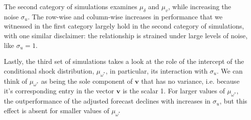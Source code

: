 \documentclass[11pt,3p,review,authoryear]{elsarticle}
\newcommand{\x}{\textbf{v}}
\theoremstyle{definition}
\begin{document}
The second category of simulations examines $\mu_{\delta}$ and $\mu_{v}$, while increasing the noise $\sigma_{u}$.  The row-wise and column-wise increases in performance that we witnessed in the first category largely hold in the second category of simulations, with one similar disclaimer: the relationship is strained under large levels of noise, like $\sigma_{u} = 1$.


Lastly, the third set of simulations takes a look at the role of the intercept of the conditional shock distribution, $\mu_{\omega^{*}}$, in particular, its interaction with $\sigma_{u}$.  We can think of $\mu_{\omega^{*}}$ as being the sole component of $\x$ that has no variance, i.e. because it's corresponding entry in the vector $\x$ is the scalar 1.  For larger values of $\mu_{\omega^{*}}$, the outperformance of the adjusted forecast declines with increases in $\sigma_{u}$, but this effect is absent for smaller values of $\mu_{\omega^{*}}$ 
\end{document}

